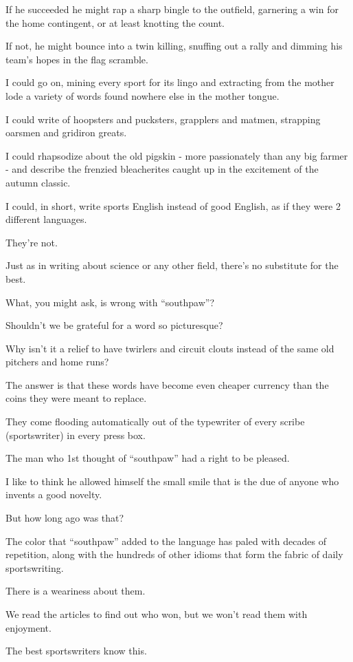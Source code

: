 \documentclass{book}
\numberwithin{equation}{section}
\begin{document}
If he succeeded he might rap a sharp bingle to the outfield, garnering a win for the home contingent, or at least knotting the count.

If not, he might bounce into a twin killing, snuffing out a rally and dimming his team's hopes in the flag scramble.

%
I could go on, mining every sport for its lingo and extracting from the mother lode a variety of words found nowhere else in the mother tongue.

I could write of hoopsters and pucksters, grapplers and matmen, strapping oarsmen and gridiron greats.

I could rhapsodize about the old pigskin - more passionately than any big farmer - and describe the frenzied bleacherites caught up in the excitement of the autumn classic.

I could, in short, write sports English instead of good English, as if they were 2 different languages.

They're not.

Just as in writing about science or any other field, there's no substitute for the best.

%
What, you might ask, is wrong with ``southpaw''?

Shouldn't we be grateful for a word so picturesque?

Why isn't it a relief to have twirlers and circuit clouts instead of the same old pitchers and home runs?

The answer is that these words have become even cheaper currency than the coins they were meant to replace.

They come flooding automatically out of the typewriter of every scribe (sportswriter) in every press box.

%
The man who 1st thought of ``southpaw'' had a right to be pleased.

I like to think he allowed himself the small smile that is the due of anyone who invents a good novelty.

But how long ago was that?

The color that ``southpaw'' added to the language has paled with decades of repetition, along with the hundreds of other idioms that form the fabric of daily sportswriting.

There is a weariness about them.

We read the articles to find out who won, but we won't read them with enjoyment.

%
The best sportswriters know this.
\end{document}
